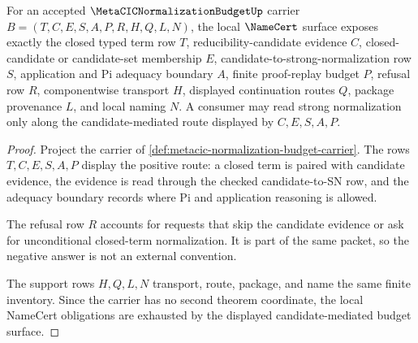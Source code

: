 \begin{theorem}
\label{thm:metacic-normalization-budget-namecert-obligations}
For an accepted $\MetaCICNormalizationBudgetUp$ carrier $B=(T,C,E,S,A,P,R,H,Q,L,N)$, the local $\NameCert$ surface exposes exactly the closed typed term row $T$, reducibility-candidate evidence $C$, closed-candidate or candidate-set membership $E$, candidate-to-strong-normalization row $S$, application and Pi adequacy boundary $A$, finite proof-replay budget $P$, refusal row $R$, componentwise transport $H$, displayed continuation routes $Q$, package provenance $L$, and local naming $N$. A consumer may read strong normalization only along the candidate-mediated route displayed by $C,E,S,A,P$.
\end{theorem}
\begin{proof}
Project the carrier of \autoref{def:metacic-normalization-budget-carrier}. The rows $T,C,E,S,A,P$ display the positive route: a closed term is paired with candidate evidence, the evidence is read through the checked candidate-to-SN row, and the adequacy boundary records where Pi and application reasoning is allowed.

The refusal row $R$ accounts for requests that skip the candidate evidence or ask for unconditional closed-term normalization. It is part of the same packet, so the negative answer is not an external convention.

The support rows $H,Q,L,N$ transport, route, package, and name the same finite inventory. Since the carrier has no second theorem coordinate, the local NameCert obligations are exhausted by the displayed candidate-mediated budget surface.
\end{proof}

